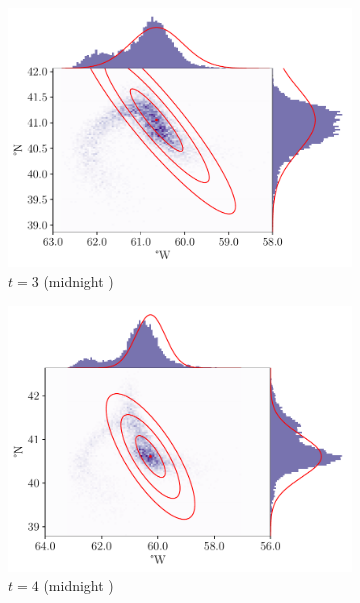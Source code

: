 \begin{figure}
\begin{center}
\begin{subfigure}{0.49\textwidth}
			\includegraphics[width=\textwidth]{chp06_applications/figures/gulf_stream/traj_stoch_em_3.0}
			\caption{\(t = 3\) (midnight )}
			\label{fig:natl_em_3}
		\end{subfigure}
		\begin{subfigure}{0.49\textwidth}
			\includegraphics[width=\textwidth]{chp06_applications/figures/gulf_stream/traj_stoch_em_4.0}
			\caption{\(t = 4\) (midnight )}
		\end{subfigure}
		\begin{subfigure}{0.49\textwidth}

\end{subfigure}
\end{center}
\end{figure}
